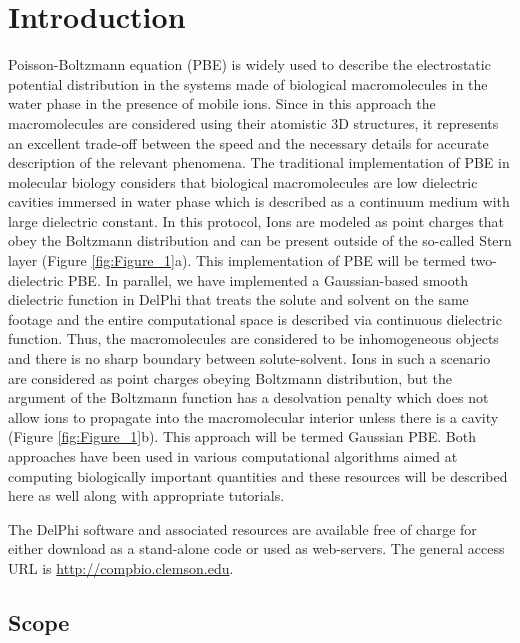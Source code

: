 \documentclass[9pt,tutorial,pubversion]{livecoms}
\begin{document}
\section{Introduction}
Poisson-Boltzmann equation (PBE) is widely used to describe the electrostatic potential distribution in the systems made of biological macromolecules in the water phase in the presence of mobile ions\cite{xiao2017continuum,li2013progress,jurrus2018improvements,nguyen2017accurate}. Since in this approach the macromolecules are considered using their atomistic 3D structures, it represents an excellent trade-off between the speed and the necessary details for accurate description of the relevant phenomena. The traditional implementation of PBE in molecular biology considers that biological macromolecules are low dielectric cavities immersed in water phase which is described as a continuum medium with large dielectric constant. In this protocol, Ions are modeled as point charges that obey the Boltzmann distribution and can be present outside of the so-called Stern layer (Figure \ref{fig:Figure_1}a). This implementation of PBE will be termed two-dielectric PBE. In parallel, we have implemented a Gaussian-based smooth dielectric function in DelPhi that treats the solute and solvent on the same footage and the entire computational space is described via continuous dielectric function\cite{chakravorty2018gaussian,jia2017treating,li2014modeling,li2013dielectric}. Thus, the macromolecules are considered to be inhomogeneous objects and there is no sharp boundary between solute-solvent. Ions in such a scenario are considered as point charges obeying Boltzmann distribution, but the argument of the Boltzmann function has a desolvation penalty which does not allow ions to propagate into the macromolecular interior unless there is a cavity (Figure \ref{fig:Figure_1}b). This approach will be termed Gaussian PBE. Both approaches have been used in various computational algorithms aimed at computing biologically important quantities and these resources will be described here as well along with appropriate tutorials.

The DelPhi software and associated resources are available free of charge for either download as a stand-alone code or used as web-servers. The general access URL is \url{http://compbio.clemson.edu}. 

\subsection{Scope}
\end{document}

